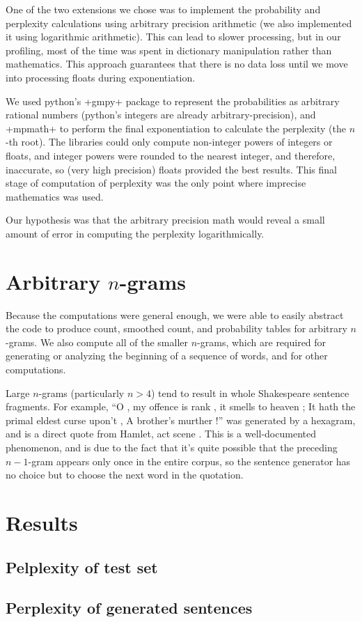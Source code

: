 \documentclass{article}
\newcommand{\osn}{\oldstylenums}
\begin{document}
		One of the two extensions we chose was to implement the probability and
		perplexity calculations using arbitrary precision arithmetic (we also
		implemented it using logarithmic arithmetic).  This can lead to slower
		processing, but in our profiling, most of the time was spent in
		dictionary manipulation rather than mathematics.  This approach
		guarantees that there is no data loss until we move into processing
		floats during exponentiation.

		We used python's +gmpy+ package to represent the probabilities as
		arbitrary rational numbers (python's integers are already
		arbitrary-precision), and +mpmath+ to perform the final exponentiation
		to calculate the perplexity (the $n$-th root).  The libraries could only
		compute non-integer powers of integers or floats, and integer powers
		were rounded to the nearest integer, and therefore, inaccurate, so
		(very high precision) floats provided the best results.  This final
		stage of computation of perplexity was the only point where imprecise
		mathematics was used.

		Our hypothesis was that the arbitrary precision math would reveal a
		small amount of error in computing the perplexity logarithmically.

	\section*{Arbitrary $n$-grams}
	
		Because the computations were general enough, we were able to easily
		abstract the code to produce count, smoothed count, and probability
		tables for arbitrary $n$-grams.  We also compute all of the smaller
		$n$-grams, which are required for generating or analyzing the beginning
		of a sequence of words, and for other computations.

		Large $n$-grams (particularly $n > 4$) tend to result in whole
		Shakespeare sentence fragments.  For example, ``O , my offence is rank ,
		it smells to heaven ; It hath the primal eldest curse upon't , A
		brother's murther !'' was generated by a hexagram, and is a direct quote
		from Hamlet, act \osn{3} scene \osn{3}.  This is a well-documented
		phenomenon, and is due to the fact that it's quite possible that the
		preceding $n-1$-gram appears only once in the entire corpus, so the
		sentence generator has no choice but to choose the next word in the
		quotation.
		
\section*{Results}
	
	\subsection*{Pelplexity of test set}
	
	\subsection*{Perplexity of generated sentences}
\end{document}
